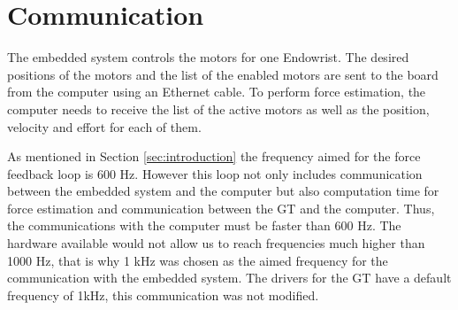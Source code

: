 \section{Communication}
The embedded system controls the motors for one Endowrist. The desired positions of the motors and the list of the enabled motors are sent to the board from the computer using an Ethernet cable. To perform force estimation, the computer needs to receive the list of the active motors as well as the position, velocity and effort for each of them.

As mentioned in Section \ref{sec:introduction} the frequency aimed for the force feedback loop is 600 Hz. However this loop not only includes communication between the embedded system and the computer but also computation time for force estimation and communication between the GT and the computer. Thus, the communications with the computer must be faster than 600 Hz. The hardware available would not allow us to reach frequencies much higher than 1000 Hz, that is why 1 kHz was chosen as the aimed frequency for the communication with the embedded system. The drivers for the GT have a default frequency of 1kHz, this communication was not modified.


